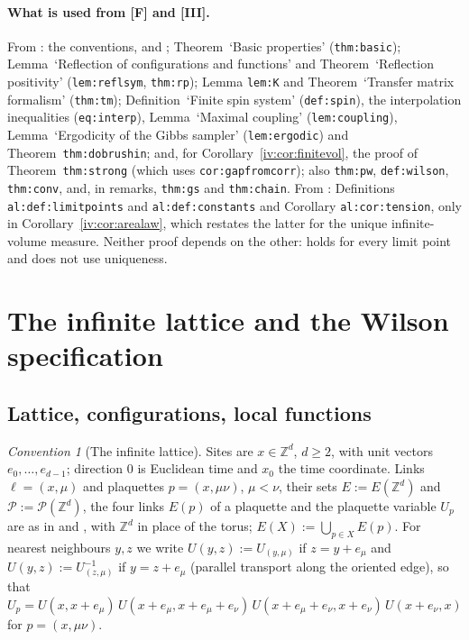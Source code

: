 \documentclass[11pt,a4paper]{article}
\theoremstyle{definition}
\theoremstyle{remark}
\newtheorem{convention}[theorem]{Convention}
\newcommand{\Z}{\mathbb{Z}}
\newcommand{\cP}{\mathcal{P}}
\newcommand{\Flab}[2]{\cite[#1 \texttt{#2}]{F}}
\newcommand{\Fname}[2]{\cite[#1~`#2']{F}}
\newcommand{\IIIlab}[2]{\cite[#1 \texttt{#2}]{III}}
\begin{document}
\paragraph{What is used from [F] and [III].} From \cite{F}: the conventions, \Flab{eq.}{eq:w} and
\Flab{eq.}{eq:plaquette}; Theorem~`Basic properties' (\texttt{thm:basic}); Lemma~`Reflection of configurations and
functions' and Theorem~`Reflection positivity' (\texttt{lem:reflsym}, \texttt{thm:rp}); Lemma \texttt{lem:K} and
Theorem~`Transfer matrix formalism' (\texttt{thm:tm}); Definition~`Finite spin system' (\texttt{def:spin}), the
interpolation inequalities (\texttt{eq:interp}), Lemma~`Maximal coupling' (\texttt{lem:coupling}), Lemma~`Ergodicity of the
Gibbs sampler' (\texttt{lem:ergodic}) and Theorem~\texttt{thm:dobrushin}; and, for Corollary~\ref{iv:cor:finitevol}, the
proof of Theorem~\texttt{thm:strong} (which uses \texttt{cor:gapfromcorr}); also \texttt{thm:pw}, \texttt{def:wilson},
\texttt{thm:conv}, and, in remarks, \texttt{thm:gs} and \texttt{thm:chain}. From \cite{III}: Definitions
\texttt{al:def:limitpoints} and \texttt{al:def:constants} and Corollary \texttt{al:cor:tension}, only in
Corollary~\ref{iv:cor:arealaw}, which restates the latter for the unique infinite-volume measure. Neither proof depends on the
other: \IIIlab{Corollary}{al:cor:tension} holds for every limit point and does not use uniqueness.

\section{The infinite lattice and the Wilson specification}\label{iv:sec:setting}

\subsection{Lattice, configurations, local functions}

\begin{convention}[The infinite lattice]\label{iv:conv:lattice}
Sites are $x\in\Z^d$, $d\ge2$, with unit vectors $e_0,\dots,e_{d-1}$; direction $0$ is Euclidean time and $x_0$ the time
coordinate. Links $\ell=(x,\mu)$ and plaquettes $p=(x,\mu\nu)$, $\mu<\nu$, their sets $E:=E(\Z^d)$ and $\cP:=\cP(\Z^d)$,
the four links $E(p)$ of a plaquette and the plaquette variable $U_p$ are as in \Fname{Convention}{Lattice} and
\Flab{eq.}{eq:plaquette}, with $\Z^d$ in place of the torus; $E(X):=\bigcup_{p\in X}E(p)$. For nearest neighbours $y,z$ we
write $U(y,z):=U_{(y,\mu)}$ if $z=y+e_\mu$ and $U(y,z):=U_{(z,\mu)}^{-1}$ if $y=z+e_\mu$ (parallel transport along the
oriented edge), so that $U_p=U(x,x+e_\mu)\,U(x+e_\mu,x+e_\mu+e_\nu)\,U(x+e_\mu+e_\nu,x+e_\nu)\,U(x+e_\nu,x)$ for
$p=(x,\mu\nu)$.
\end{convention}
\end{document}

